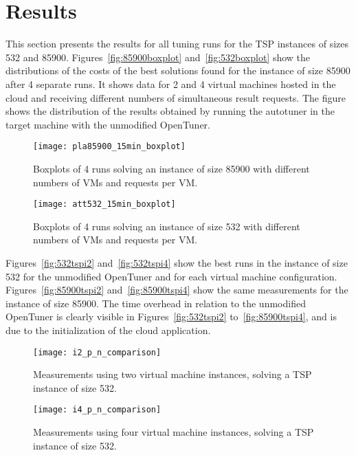 \section{Results} \label{sec:results}

This section presents the results for all tuning runs for the TSP instances of
sizes 532 and 85900.  Figures~\ref{fig:85900boxplot} and~\ref{fig:532boxplot}
show the distributions of the costs of the best solutions found for the
instance of size 85900 after 4 separate runs. It shows data for 2 and 4 virtual
machines hosted in the cloud and receiving different numbers of simultaneous
result requests.  The figure shows the distribution of the results obtained by
running the autotuner in the target machine with the unmodified OpenTuner.

\begin{figure}[htpb]
    \centering
    \begin{minipage}{.48\textwidth}
        \centering
        \texttt{[image: pla85900\_15min\_boxplot]}
        \caption{Boxplots of 4 runs solving an instance of size 85900 with
                 different numbers of VMs and requests per VM.}
        \label{fig:85900boxplot}
    \end{minipage}%
    \hfill
    \begin{minipage}{.48\textwidth}
        \centering
        \texttt{[image: att532\_15min\_boxplot]}
        \caption{Boxplots of 4 runs solving an instance of size 532 with
                 different numbers of VMs and requests per VM.}
        \label{fig:532boxplot}
    \end{minipage}%
    \label{fig:boxplots}
\end{figure}

Figures~\ref{fig:532tspi2} and~\ref{fig:532tspi4} show the best
runs in the instance of size 532 for the unmodified OpenTuner and
for each virtual machine configuration.
Figures~\ref{fig:85900tspi2} and~\ref{fig:85900tspi4} show the same
measurements for the instance of size 85900.
The time overhead in relation to the unmodified OpenTuner is clearly
visible in Figures~\ref{fig:532tspi2} to~\ref{fig:85900tspi4}, and is
due to the initialization of the cloud application.

\begin{figure}[htpb]
    \centering
    \begin{minipage}{.48\textwidth}
        \centering
        \texttt{[image: i2\_p\_n\_comparison]}
        \caption{Measurements using two virtual machine instances, solving
                 a TSP instance of size 532.}
        \label{fig:532tspi2}
    \end{minipage}%
    \hfill
    \begin{minipage}{.48\textwidth}
        \centering
        \texttt{[image: i4\_p\_n\_comparison]}
        \caption{Measurements using four virtual machine instances,
                 solving a TSP instance of size 532.}
        \label{fig:532tspi4}
    \end{minipage}%
    \label{fig:532tsp}
\end{figure}

